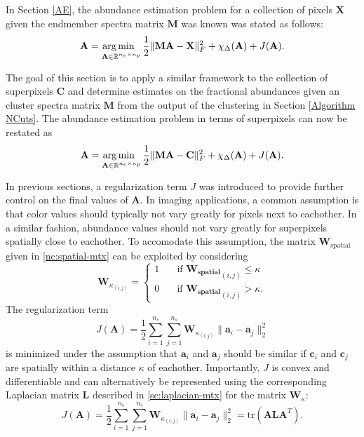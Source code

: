 In Section \ref{AE}, the abundance estimation problem for a collection of pixels $\mathbf{X}$ given the endmember spectra matrix $\mathbf{M}$ was known was stated as follows:
\begin{equation*}
    \mathbf{A} = \operatorname*{arg\,min \;\;}_{\mathbf{A} \in \mathbb{R}^{n_e \times n_p}} \frac{1}{2}\|\mathbf{MA} - \mathbf{X}\|_F^2 + \chi_\Delta(\mathbf{A}) + J(\mathbf{A}).
\end{equation*}

The goal of this section is to apply a similar framework to the collection of superpixels $\mathbf{C}$ and determine estimates on the fractional abundances given an cluster spectra matrix $\mathbf{M}$ from the output of the clustering in Section \ref{Algorithm NCuts}. The abundance estimation problem in terms of superpixels can now be restated as
\begin{equation*}
    \mathbf{A} = \operatorname*{arg\,min \;\;}_{\mathbf{A} \in \mathbb{R}^{n_e \times n_p}} \frac{1}{2}\|\mathbf{MA} - \mathbf{C}\|_F^2 + \chi_\Delta(\mathbf{A}) + J(\mathbf{A}).
\end{equation*}

In previous sections, a regularization term $J$ was introduced to provide further control on the final values of $\mathbf{A}$. In imaging applications, a common assumption is that color values should typically not vary greatly for pixels next to eachother. In a similar fashion, abundance values should not vary greatly for superpixels spatially close to eachother. To accomodate this assumption, the matrix $\mathbf{W}_{\text{spatial}}$ given in \eqref{nc:spatial-mtx} can be exploited by considering
\begin{equation}
    \label{nc:spatial_filter_mtx}
    \mathbf{W}_{{\kappa}_{(i,j)}} = \begin{cases}
        1 &\quad \text{if } \mathbf{W_{\text{spatial}}}_{(i,j)} \leq \kappa\\
        0 &\quad \text{if } \mathbf{W_{\text{spatial}}}_{(i,j)} > \kappa.
    \end{cases}
\end{equation}
The regularization term
\begin{equation*}
    J(\mathbf{A}) = \frac{1}{2}\sum_{i = 1}^{n_s} \sum_{j = 1}^{n_s} \mathbf{W}_{{\kappa}_{(i,j)}} \|\mathbf{a}_i - \mathbf{a}_j\|_2^2
\end{equation*}
is minimized under the assumption that $\mathbf{a}_i$ and $\mathbf{a}_j$ should be similar if $\mathbf{c}_i$ and $\mathbf{c}_j$ are spatially within a distance $\kappa$ of eachother. Importantly, $J$ is convex and differentiable and can alternatively be represented using the corresponding Laplacian matrix $\mathbf{L}$ described in \eqref{sc:laplacian-mtx} for the matrix $\mathbf{W}_{\kappa}$:
\begin{equation}
    \label{unmixing:distance-regularization}
    J(\mathbf{A}) = \frac{1}{2}\sum_{i = 1}^{n_s} \sum_{j = 1}^{n_s} \mathbf{W}_{{\kappa}_{(i,j)}} \|\mathbf{a}_i - \mathbf{a}_j\|_2^2 = \text{tr}(\mathbf{ALA}^T).
\end{equation}

